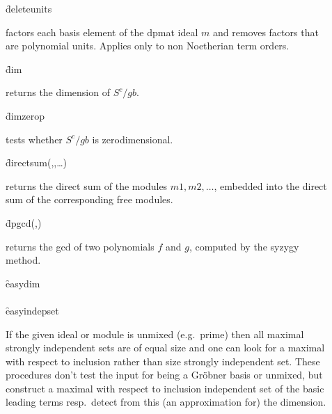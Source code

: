 \begin{description}
\item[]
  \begin{syntax}
    \f{deleteunits} 
  \end{syntax}
  \hypertarget{operator:DELETEUNITS}{}
factors each basis element of the dpmat ideal $m$ and removes
factors that are polynomial units. Applies only to non Noetherian
term orders.

\item[]
  \begin{syntax}
    \f{dim} 
  \end{syntax}
  \hypertarget{operator:DIM}{}
returns the dimension of $S^c/gb$.

\item[]
  \begin{syntax}
    \f{dimzerop} 
  \end{syntax}
  \hypertarget{operator:DIMZEROP}{}
tests whether $S^c/gb$ is zerodimensional.

\item[]
  \begin{syntax}
    \f{directsum}(,,\ldots)
  \end{syntax}
  \hypertarget{operator:DIRECTSUM}{}
returns the direct sum of the modules $m1,m2,\ldots$, embedded
into the direct sum of the corresponding free modules.

\item[]
  \begin{syntax}
    \f{dpgcd}(,)
  \end{syntax}
  \hypertarget{operator:DPGCD}{}
returns the gcd of two polynomials $f$ and $g$, computed by the
syzygy method.

\item[]
  \begin{syntaxtable}
    \f{easydim}  \\
    \\
    \f{easyindepset} 
  \end{syntaxtable}
  \hypertarget{operator:EASYDIM}{}
  \hypertarget{operator:EASYINDEPSET}{}
 If the given ideal or module is unmixed (e.g.\ prime) then all
maximal strongly independent sets are of equal size and one can look
for a maximal with respect to inclusion rather than size strongly
independent set. These procedures don't test the input for being a
Gr\"obner basis or unmixed, but construct a maximal with respect to
inclusion independent set of the basic leading terms resp.\ detect
from this (an approximation for) the dimension.


\end{description}
